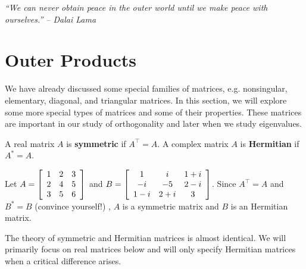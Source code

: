 \begin{center} 
\emph{``We can never obtain peace in the outer world until we make peace with ourselves.'' -- Dalai Lama}
\end{center}

\section{Outer Products}\label{sec:outer}
We have already discussed some special families of matrices, e.g. nonsingular, elementary, diagonal, and triangular matrices. In this section, we will explore some more special types of matrices and some of their properties. These matrices are important in our study of orthogonality and later when we study eigenvalues.\\

\begin{Def} A real matrix $A$ is \textbf{symmetric} if $A^\top  = A$. A complex matrix $A$ is \textbf{Hermitian} if $A^*=A$.\end{Def}\vs

\begin{Exam} Let $A = \mtx{ccc}{1&2&3\\2&4&5\\3&5&6} $ and $B = \mtx{ccc}{1 & i & 1+i \\ -i & -5 & 2-i \\ 1-i & 2+i & 3}$.  Since $A^\top=A$ and $B^*=B$ (convince yourself!)%
, $A$ is a symmetric matrix and $B$ is an Hermitian matrix.
\end{Exam}\vs

The theory of symmetric and Hermitian matrices is almost identical. We will primarily focus on real matrices below and will only specify Hermitian matrices when a critical difference arises.\\

